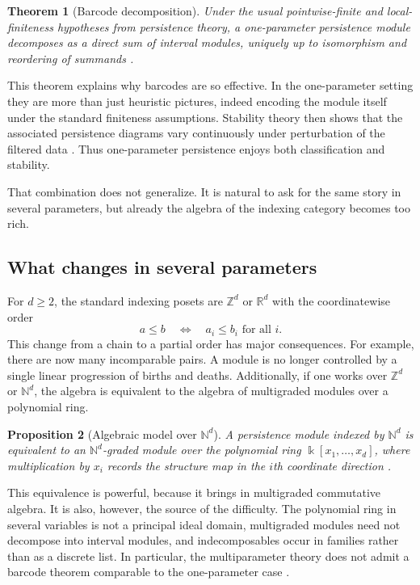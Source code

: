 \documentclass[11pt]{article}
\newcommand{\R}{\mathbb{R}}
\newcommand{\Z}{\mathbb{Z}}
\newcommand{\kk}{\Bbbk}
\newtheorem{theorem}{Theorem}
\newtheorem{proposition}[theorem]{Proposition}
\theoremstyle{definition}
\theoremstyle{remark}
\begin{document}
\begin{theorem}[Barcode decomposition]
Under the usual pointwise-finite and local-finiteness hypotheses from persistence theory, a one-parameter persistence module decomposes as a direct sum of interval modules, uniquely up to isomorphism and reordering of summands \cite{CB15,Oud15}.
\end{theorem}

This theorem explains why barcodes are so effective. In the one-parameter setting they are more than just heuristic pictures, indeed encoding the module itself under the standard finiteness assumptions. Stability theory then shows that the associated persistence diagrams vary continuously under perturbation of the filtered data \cite{ELZ02,CEH07,CDSGO16}. Thus one-parameter persistence enjoys both classification and stability.

That combination does not generalize. It is natural to ask for the same story in several parameters, but already the algebra of the indexing category becomes too rich.

\subsection{What changes in several parameters}

For $d \geq 2$, the standard indexing posets are $\Z^d$ or $\R^d$ with the coordinatewise order
\[
a \leq b \quad \Longleftrightarrow \quad a_i \leq b_i \text{ for all } i.
\]
This change from a chain to a partial order has major consequences. For example, there are now many incomparable pairs. A module is no longer controlled by a single linear progression of births and deaths. Additionally, if one works over $\Z^d$ or $\mathbb{N}^d$, the algebra is equivalent to the algebra of multigraded modules over a polynomial ring.

\begin{proposition}[Algebraic model over $\mathbb{N}^d$]
A persistence module indexed by $\mathbb{N}^d$ is equivalent to an $\mathbb{N}^d$-graded module over the polynomial ring $\kk[x_1,\dots,x_d]$, where multiplication by $x_i$ records the structure map in the $i$th coordinate direction \cite{CZ09,Oud15}.
\end{proposition}

This equivalence is powerful, because it brings in multigraded commutative algebra. It is also, however, the source of the difficulty. The polynomial ring in several variables is not a principal ideal domain, multigraded modules need not decompose into interval modules, and indecomposables occur in families rather than as a discrete list. In particular, the multiparameter theory does not admit a barcode theorem comparable to the one-parameter case \cite{CZ09,Les15}.
\end{document}
